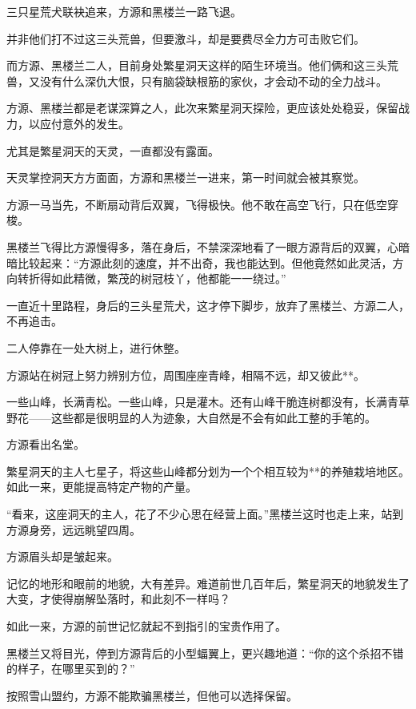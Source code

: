 
\begin{this_body}

三只星荒犬联袂追来，方源和黑楼兰一路飞退。

并非他们打不过这三头荒兽，但要激斗，却是要费尽全力方可击败它们。

而方源、黑楼兰二人，目前身处繁星洞天这样的陌生环境当。他们俩和这三头荒兽，又没有什么深仇大恨，只有脑袋缺根筋的家伙，才会动不动的全力战斗。

方源、黑楼兰都是老谋深算之人，此次来繁星洞天探险，更应该处处稳妥，保留战力，以应付意外的发生。

尤其是繁星洞天的天灵，一直都没有露面。

天灵掌控洞天方方面面，方源和黑楼兰一进来，第一时间就会被其察觉。

方源一马当先，不断扇动背后双翼，飞得极快。他不敢在高空飞行，只在低空穿梭。

黑楼兰飞得比方源慢得多，落在身后，不禁深深地看了一眼方源背后的双翼，心暗暗比较起来：“方源此刻的速度，并不出奇，我也能达到。但他竟然如此灵活，方向转折得如此精微，繁茂的树冠枝丫，他都能一一绕过。”

一直近十里路程，身后的三头星荒犬，这才停下脚步，放弃了黑楼兰、方源二人，不再追击。

二人停靠在一处大树上，进行休整。

方源站在树冠上努力辨别方位，周围座座青峰，相隔不远，却又彼此**。

一些山峰，长满青松。一些山峰，只是灌木。还有山峰干脆连树都没有，长满青草野花——这些都是很明显的人为迹象，大自然是不会有如此工整的手笔的。

方源看出名堂。

繁星洞天的主人七星子，将这些山峰都分划为一个个相互较为**的养殖栽培地区。如此一来，更能提高特定产物的产量。

“看来，这座洞天的主人，花了不少心思在经营上面。”黑楼兰这时也走上来，站到方源身旁，远远眺望四周。

方源眉头却是皱起来。

记忆的地形和眼前的地貌，大有差异。难道前世几百年后，繁星洞天的地貌发生了大变，才使得崩解坠落时，和此刻不一样吗？

如此一来，方源的前世记忆就起不到指引的宝贵作用了。

黑楼兰又将目光，停到方源背后的小型蝠翼上，更兴趣地道：“你的这个杀招不错的样子，在哪里买到的？”

按照雪山盟约，方源不能欺骗黑楼兰，但他可以选择保留。


\end{this_body}
